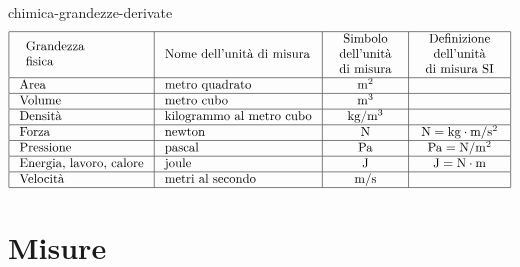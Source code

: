 \documentclass[preview]{standalone}
\begin{document}
\begin{snippet}{chimica-grandezze-derivate}
    \phantom{}$$
    \begin{array}{|l|l|c|c|}
    \hline \begin{array}{l}
    \text { Grandezza } \\
    \text { fisica }
    \end{array} & \text { Nome dell'unità di misura } & \begin{array}{c}
    \text { Simbolo } \\
    \text { dell'unità } \\
    \text { di misura }
    \end{array} & \begin{array}{c}
    \text { Definizione } \\
    \text { dell'unità } \\
    \text { di misura SI }
    \end{array} \\
    \hline \text { Area } & \text { metro quadrato } & \mathrm{m}^2 & \\
    \hline \text { Volume } & \text { metro cubo } & \mathrm{m}^3 & \\
    \hline \text { Densità } & \text { kilogrammo al metro cubo } & \mathrm{kg} / \mathrm{m}^3 & \\
    \hline \text { Forza } & \text { newton } & \mathrm{N} & \mathrm{N}=\mathrm{kg} \cdot \mathrm{m} / \mathrm{s}^2 \\
    \hline \text { Pressione } & \text { pascal } & \mathrm{Pa} & \mathrm{Pa}=\mathrm{N} / \mathrm{m}^2 \\
    \hline \text { Energia, lavoro, calore } & \text { joule } & \mathrm{J} & \mathrm{J}=\mathrm{N} \cdot \mathrm{m} \\
    \hline \text { Velocità } & \text { metri al secondo } & \mathrm{m} / \mathrm{s} & \\
    \hline
    \end{array}
    $$
\end{snippet}

\section{Misure}
\end{document}
